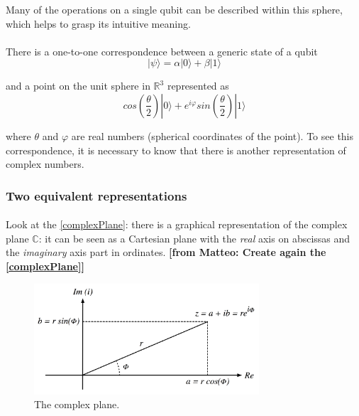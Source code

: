 \documentclass[a4paper,10pt]{article}
\newcommand{\from}[2]{{\bf[{\sc from #1:} #2]}}
\begin{document}
Many of the operations on a single qubit can be described within this sphere, which helps to grasp its intuitive meaning.

\paragraph{} There is a one-to-one correspondence between a generic state of a qubit
\begin{equation}
|\psi\rangle = \alpha|0\rangle + \beta|1\rangle
\label{eq:qubitStateDirac}
\end{equation}

and a point on the unit sphere in ${\mathbb{R}}^3$ represented as
\begin{equation}
cos\left(\frac{\theta}{2}\right)|0\rangle + e^{i\varphi}sin\left(\frac{\theta}{2}\right)|1\rangle
\label{eq:qubitStateBlock}
\end{equation}

where $\theta$ and $\varphi$ are real numbers (spherical coordinates of the point). To see this correspondence, it is necessary to know that there is another representation of complex numbers.

\subsubsection{Two equivalent representations}

\paragraph{} Look at the \autoref{complexPlane}: there is a graphical representation of the complex plane ${\mathbb{C}}$: it can be seen as a Cartesian plane with the \textit{real} axis on abscissas and the \textit{imaginary} axis part in ordinates.
\from{Matteo}{Create again the \autoref{complexPlane}}
\begin{figure}[!htb]
\begin{center}
\includegraphics[width=3.3in]{images/complexPlane.png}
\caption{The complex plane.}
\label{complexPlane}
\end{center}
\end{figure}
\end{document}
